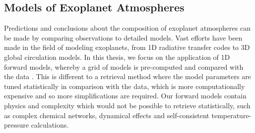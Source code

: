 

\subsection{Models of Exoplanet Atmospheres}%

Predictions and conclusions about the composition of exoplanet atmospheres can be made by comparing observations to detailed models. Vast efforts have been made in the field of modeling exoplanets, from 1D radiative transfer codes to 3D global circulation models. In this thesis, we focus on the application of 1D forward models, whereby a grid of models is pre-computed and compared with the data \citep{Zhang2019, Tsai2017, Piskorz2018, Line2013a}. This is different to a retrieval method where the model parameters are tuned statistically in comparison with the data, which is more computationally expensive and so more simplifications are required. Our forward models contain physics and complexity which would not be possible to retrieve statistically, such as complex chemical networks, dynamical effects and self-consistent temperature-pressure calculations.

